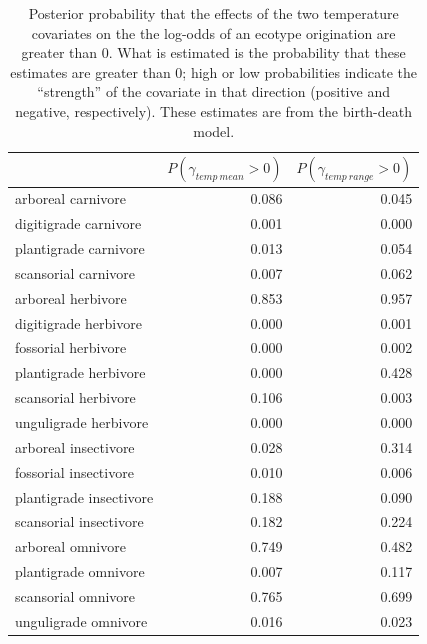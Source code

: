\documentclass[12pt,letterpaper]{article}
\begin{document}
\begin{table}[ht]
  \centering
  \caption[Posterior probablity of effects of temperature on origination]{Posterior probability that the effects of the two temperature covariates on the the log-odds of an ecotype origination are greater than 0. What is estimated is the probability that these estimates are greater than 0; high or low probabilities indicate the ``strength'' of the covariate in that direction (positive and negative, respectively). These estimates are from the birth-death model.}
  \label{tab:origin_temp}
  \begin{tabular}{ l r r }
    \hline
    & \(P(\gamma_{temp\ mean} > 0)\) & \(P(\gamma_{temp\ range} > 0)\) \\ 
    \hline
    arboreal carnivore & 0.086 & 0.045 \\ 
    digitigrade carnivore & 0.001 & 0.000 \\ 
    plantigrade carnivore & 0.013 & 0.054 \\ 
    scansorial carnivore & 0.007 & 0.062 \\ 
    arboreal herbivore & 0.853 & 0.957 \\ 
    digitigrade herbivore & 0.000 & 0.001 \\ 
    fossorial herbivore & 0.000 & 0.002 \\ 
    plantigrade herbivore & 0.000 & 0.428 \\ 
    scansorial herbivore & 0.106 & 0.003 \\ 
    unguligrade herbivore & 0.000 & 0.000 \\ 
    arboreal insectivore & 0.028 & 0.314 \\ 
    fossorial insectivore & 0.010 & 0.006 \\ 
    plantigrade insectivore & 0.188 & 0.090 \\ 
    scansorial insectivore & 0.182 & 0.224 \\ 
    arboreal omnivore & 0.749 & 0.482 \\ 
    plantigrade omnivore & 0.007 & 0.117 \\ 
    scansorial omnivore & 0.765 & 0.699 \\ 
    unguligrade omnivore & 0.016 & 0.023 \\ 
    \hline
  \end{tabular}
\end{table}
\end{document}
